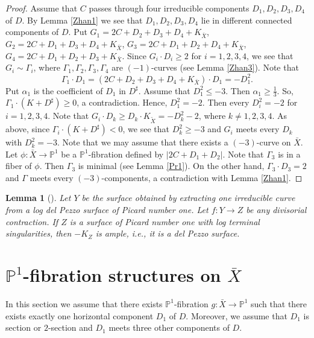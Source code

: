\documentclass[10pt,oneside,reqno]{amsart}
\newcommand{\pp}{\mathbb{P}}
\newtheorem{lemma}[theorem]{Lemma}
\theoremstyle{definition}
\theoremstyle{remark}
\numberwithin{equation}{section}
\begin{document}
\begin{proof}
Assume that $C$ passes through four irreducible components $D_1,D_2,D_3,D_4$ of $D$. By Lemma \ref{Zhan1} we see that $D_1,D_2,D_3,D_4$ lie in different connected components of $D$. Put $G_1=2C+D_2+D_3+D_4+K_{\bar{X}}$, $G_2=2C+D_1+D_3+D_4+K_{\bar{X}}$, $G_3=2C+D_1+D_2+D_4+K_{\bar{X}}$, $G_4=2C+D_1+D_2+D_3+K_{\bar{X}}$. Since $G_i\cdot D_i\geq 2$ for $i=1,2,3,4$, we see that $G_i\sim\Gamma_i$, where $\Gamma_1,\Gamma_2,\Gamma_3,\Gamma_4$ are $(-1)$-curves (see Lemma \ref{Zhan3}). Note that \[\Gamma_1\cdot D_1=(2C+D_2+D_3+D_4+K_{\bar{X}})\cdot D_1=-D_1^2.\]
Put $\alpha_1$ is the coefficient of $D_1$ in $D^{\sharp}$. Assume that $D_1^2\leq -3$. Then $\alpha_1\geq\frac{1}{3}$. So, $\Gamma_1\cdot(K+D^\sharp)\geq 0$, a contradiction. Hence, $D_1^2=-2$. Then every $D_i^2=-2$ for $i=1,2,3,4$. Note that $G_i\cdot D_k\geq D_k\cdot K_{\tilde{X}}=-D_k^2-2$, where $k\neq 1,2,3,4$. As above, since $\Gamma_i\cdot(K+D^\sharp)< 0$, we see that $D_k^2\geq -3$ and $G_i$ meets every $D_k$ with $D_k^2=-3$. Note that we may assume that there exists a $(-3)$-curve on $\bar{X}$.
Let $\phi\colon\bar{X}\rightarrow\pp^1$ be a $\pp^1$-fibration defined by $|2C+D_1+D_2|$. Note that $\Gamma_3$ is in a fiber of $\phi$. Then $\Gamma_3$ is minimal (see Lemma \ref{Pr1}). On the other hand, $\Gamma_3\cdot D_3=2$ and $\Gamma$ meets every $(-3)$-components, a contradiction with Lemma \ref{Zhan1}.
\end{proof}


\begin{lemma}[{\cite[Chapter 5]{Pro1}}]
\label{WeekD} Let $Y$ be the surface obtained by extracting one irreducible curve from a log del Pezzo surface of Picard number one. Let $f\colon Y \rightarrow Z$ be any divisorial contraction. If $Z$ is a surface of Picard number one with log terminal singularities, then $-K_Z$ is ample, i.e., it is a del Pezzo surface.
\end{lemma}

\section{$\pp^1$-fibration structures on $\bar{X}$}
\label{P1Fib}

In this section we assume that there exists $\pp^1$-fibration $g\colon\bar{X}\rightarrow\pp^1$ such that there exists exactly one horizontal component $D_1$ of $D$. Moreover, we assume that $D_1$ is section or $2$-section and $D_1$ meets three other components of $D$.
\end{document}
